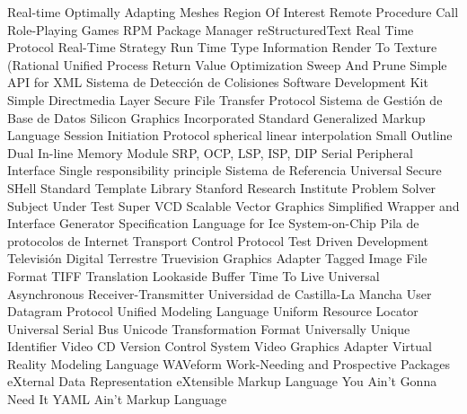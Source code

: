 {\begin{acronym}[XXXXXXXX]
   {Real-time Optimally Adapting Meshes}
    {Region Of Interest}
    {Remote Procedure Call}
    {Role-Playing Games}
    {\acs{RPM} Package Manager}
    {reStructuredText}
    {Real Time Protocol}
    {Real-Time Strategy}
   {Run Time Type Information}
    {Render To Texture}
    {(Rational Unified Process}
    {Return Value Optimization}
    {Sweep And Prune}
    {Simple \acs{API} for \acs{XML}}
    {Sistema de Detección de Colisiones}
    {Software Development Kit}
    {Simple Directmedia Layer}
   {Secure File Transfer Protocol}
   {Sistema de Gestión de Base de Datos}
    {Silicon Graphics Incorporated}
   {Standard Generalized Markup Language}
    {Session Initiation Protocol}
  {spherical linear interpolation}
 {Small Outline Dual In-line Memory Module}
  {\acs{SRP}, \acs{OCP}, \acs{LSP}, \acs{ISP}, \acs{DIP}}
    {Serial Peripheral Interface}
    {Single responsibility principle}
    {Sistema de Referencia Universal}
    {Secure SHell}
    {Standard Template Library}
 {Stanford Research Institute Problem Solver}
    {Subject Under Test}
   {Super \acs{VCD}}
    {Scalable Vector Graphics}
   {Simplified Wrapper and Interface Generator}
  {Specification Language for Ice}
    {System-on-Chip}
 {Pila de protocolos de Internet}
    {Transport Control Protocol}
    {Test Driven Development}
    {Televisión Digital Terrestre}
    {Truevision Graphics Adapter}
   {Tagged Image File Format}
    {\acs{TIFF}}
    {Translation Lookaside Buffer}
    {Time To Live}
   {Universal Asynchronous Receiver-Transmitter}
   {Universidad de Castilla-La Mancha}
    {User Datagram Protocol}
    {Unified Modeling Language}
    {Uniform Resource Locator}
    {Universal Serial Bus}
    {Unicode Transformation Format}
   {Universally Unique Identifier}
    {Video \acs{CD}}
    {Version Control System}
    {Video Graphics Adapter}
   {Virtual Reality Modeling Language}
    {WAVeform}
   {Work-Needing and Prospective Packages}
    {eXternal Data Representation}
    {eXtensible Markup Language}
  {You Ain't Gonna Need It}
   {YAML Ain't Markup Language}
\end{acronym}
}



